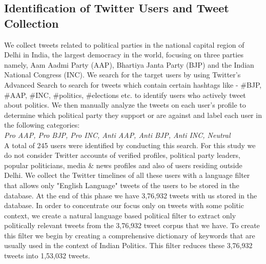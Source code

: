 \documentclass[a0,portrait]{a0poster}
\begin{document}
\begin{multicols}{2}
\subsection*{Identification of Twitter Users and Tweet Collection}
We collect tweets related to political parties in the national capital region of Delhi in India, the largest democracy in the world, focusing on three parties namely, Aam Aadmi Party (AAP), Bhartiya Janta Party (BJP) and the Indian National Congress (INC).
We search for the target users by using Twitter's Advanced Search to search for tweets which contain certain hashtags like - \#BJP, \#AAP, \#INC, \#politics, \#elections  etc. to identify users who actively tweet about politics. 
We then manually analyze the tweets on each user's profile to determine which political party they support or are against and label each user in the following categories:\\ \textit{Pro AAP, Pro BJP, Pro INC, Anti AAP, Anti BJP, Anti INC, Neutral}\\
A total of 245 users were identified by conducting this search. For this study we do not consider Twitter accounts of verified profiles, political party leaders, popular politicians, media \& news profiles and also of users residing outside Delhi. We collect the Twitter timelines of all these users with a language filter that allows only "English Language" tweets of the users to be stored in the database. At the end of this phase we have 3,76,932 tweets with us stored in the database.
In order to concentrate our focus only on tweets with some politic context, we create a natural language based political filter to extract only politically relevant tweets from the 3,76,932 tweet corpus that we have. To create this filter we begin by creating a comprehensive dictionary of keywords that are usually used in the context of Indian Politics. This filter reduces these 3,76,932 tweets into 1,53,032 tweets.

\end{multicols}
\end{document}
